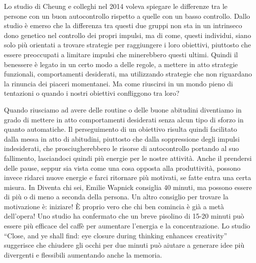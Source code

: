 \documentclass[12pt]{book} %
\begin{document}
\begin{mdframed}[linewidth=1pt]
Lo studio di Cheung e colleghi nel 2014 voleva spiegare le differenze tra le persone con un buon autocontrollo rispetto
a quelle con un basso controllo. Dallo studio è emerso che la differenza tra questi due gruppi non sta in un intrinseco
dono genetico nel controllo dei propri impulsi, ma di come, questi individui, siano solo più orientati a trovare
strategie per raggiungere i loro obiettivi, piuttosto che essere preoccupati a limitare impulsi che minerebbero questi
ultimi. Quindi il benessere è legato in un certo modo a delle regole, a mettere in atto strategie funzionali,
comportamenti desiderati, ma utilizzando strategie che non riguardano la rinuncia dei piaceri momentanei. Ma come
riuscirsi in un mondo pieno di tentazioni o quando i nostri obiettivi confliggono tra loro? 

Quando riusciamo ad avere delle routine o delle buone abitudini diventiamo in grado di mettere in atto comportamenti
desiderati senza alcun tipo di sforzo in quanto automatiche. Il perseguimento di un obiettivo risulta quindi facilitato
dalla messa in atto di abitudini, piuttosto che dalla soppressione degli impulsi indesiderati, che prosciugherebbero le
risorse di autocontrollo portando al suo fallimento, lasciandoci quindi più energie per le nostre
attività. Anche il prendersi delle pause, seppur
sia vista come una cosa opposta alla produttività, possono invece ridarci nuove energie e farci ritornare più motivati,
se fatte entra una certa misura. In Diventa chi sei, Emilie Wapnick
consiglia 40 minuti, ma possono essere di più o di meno a seconda della persona. Un altro consiglio per trovare la
motivazione è: iniziare! È proprio vero che chi ben comincia è già a metà dell'opera! 
Uno studio ha confermato che un breve pisolino di 15-20 minuti può essere più efficace del caffè per aumentare l’energia e la concentrazione.
Lo studio “Close, and ye shall find: eye closure during thinking enhances creativity” suggerisce che chiudere gli occhi per due minuti può aiutare a generare idee più divergenti e flessibili aumentando anche la memoria.


\end{mdframed}
\end{document}
